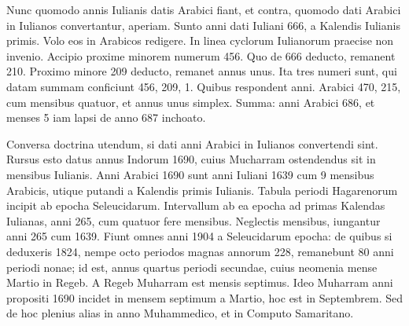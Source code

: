 Nunc quomodo annis Iulianis datis Arabici
fiant, et contra, quomodo dati Arabici in Iulianos convertantur, aperiam.
Sunto anni dati Iuliani 666, a Kalendis Iulianis primis.
Volo eos
in Arabicos redigere.
In linea cyclorum Iulianorum praecise non invenio.
Accipio proxime minorem numerum 456.
Quo de 666 deducto,
remanent 210.
Proximo minore 209 deducto, remanet annus
unus.
Ita tres numeri sunt, qui datam summam conficiunt 456, 209, 1.
Quibus respondent anni.
Arabici 470, 215, cum mensibus
quatuor, et annus unus simplex.
%
Summa: anni
Arabici 686, et menses 5 iam lapsi de anno
687 inchoato.
\begin{table}[t]
  
\end{table}
Conversa doctrina utendum,
si dati anni Arabici in Iulianos convertendi
sint.
Rursus esto datus annus Indorum
1690, cuius Mucharram ostendendus sit in mensibus
Iulianis.
Anni Arabici 1690 sunt anni
Iuliani 1639 cum 9 mensibus Arabicis, utique
putandi a Kalendis primis Iulianis.
Tabula periodi
Hagarenorum incipit ab epocha Seleucidarum.
Intervallum ab ea epocha ad primas
Kalendas Iulianas, anni 265, cum quatuor fere
mensibus.
Neglectis mensibus, iungantur
anni 265 cum 1639.
Fiunt omnes anni 1904
a Seleucidarum epocha: de quibus si deduxeris
1824, nempe octo periodos magnas annorum
228, remanebunt 80 anni periodi nonae;
id est, annus quartus periodi secundae, cuius neomenia mense Martio
in Regeb.
A Regeb Muharram est mensis septimus.
Ideo Muharram
anni propositi 1690 incidet in mensem septimum a Martio,
hoc est in Septembrem.
Sed de hoc plenius alias in anno Muhammedico,
et in Computo Samaritano.
%
